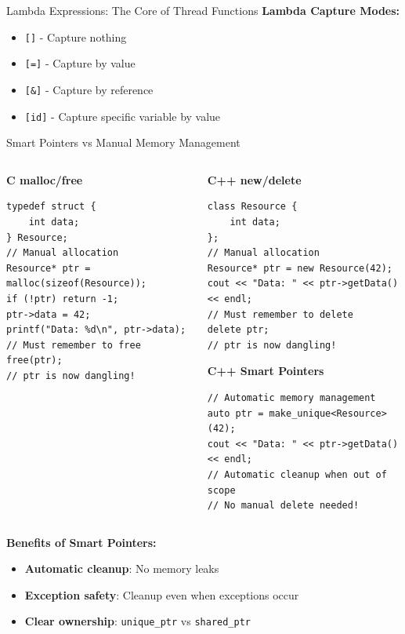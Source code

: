 \begin{frame}[fragile]{ Lambda Expressions: The Core of Thread Functions}
	\textbf{Lambda Capture Modes:}
	\begin{itemize}
		\item \texttt{[]} - Capture nothing
		\item \texttt{[=]} - Capture by value
		\item \texttt{[\&]} - Capture by reference
		\item \texttt{[id]} - Capture specific variable by value
	\end{itemize}
\end{frame}

\begin{frame}[fragile]{ Smart Pointers vs Manual Memory Management}
	\begin{columns}
		\begin{column}{0.5\textwidth}
			\textbf{C malloc/free}
			\begin{verbatim}
typedef struct {
    int data;
} Resource;
// Manual allocation
Resource* ptr = malloc(sizeof(Resource));
if (!ptr) return -1;
ptr->data = 42;
printf("Data: %d\n", ptr->data);
// Must remember to free
free(ptr);
// ptr is now dangling!
			\end{verbatim}
		\end{column}
		\begin{column}{0.5\textwidth}
			\textbf{C++ new/delete}
			\begin{verbatim}
class Resource {
    int data;
};
// Manual allocation
Resource* ptr = new Resource(42);
cout << "Data: " << ptr->getData() << endl;
// Must remember to delete
delete ptr;
// ptr is now dangling!
			\end{verbatim}
			\textbf{C++ Smart Pointers}
			\begin{verbatim}
// Automatic memory management
auto ptr = make_unique<Resource>(42);
cout << "Data: " << ptr->getData() << endl;
// Automatic cleanup when out of scope
// No manual delete needed!
			\end{verbatim}
		\end{column}
	\end{columns}

	\vspace{0.5em}
	\textbf{Benefits of Smart Pointers:}
	\begin{itemize}
		\item \textbf{Automatic cleanup}: No memory leaks
		\item \textbf{Exception safety}: Cleanup even when exceptions occur
		\item \textbf{Clear ownership}: \texttt{unique\_ptr} vs \texttt{shared\_ptr}
	\end{itemize}
\end{frame}

